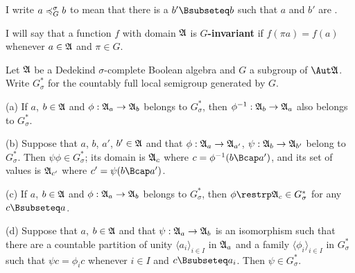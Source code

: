 I write $a\preccurlyeq^{\sigma}_G b$ to mean that there is a $b'\Bsubseteq b$ such
that $a$ and $b'$ are \Gse.

I will say that a function $f$ with domain
$\frak A$ is {\bf $G$-invariant} if $f(\pi a)=f(a)$ whenever
$a\in\frak A$ and $\pi\in G$.


 Let $\frak A$ be a Dedekind $\sigma$-complete
Boolean algebra and $G$ a subgroup of $\Aut\frak A$.   Write
$G^*_{\sigma}$ for the countably full local semigroup generated by $G$.

(a) If $a$, $b\in\frak A$ and $\phi:\frak A_a\to\frak A_b$ belongs to
$G^*_{\sigma}$, then $\phi^{-1}:\frak A_b\to\frak A_a$ also belongs to
$G^*_{\sigma}$.

(b) Suppose that $a$, $b$, $a'$, $b'\in\frak A$ and that
$\phi:\frak A_a\to\frak A_{a'}$, $\psi:\frak A_{b}\to\frak A_{b'}$
belong to $G^*_{\sigma}$.   Then $\psi\phi\in G^*_{\sigma}$;
its domain is $\frak A_c$ where $c=\phi^{-1}(b\Bcap a')$, and its
set of values is $\frak A_{c'}$ where $c'=\psi(b\Bcap a')$.

(c) If $a$, $b\in\frak A$ and $\phi:\frak A_a\to\frak A_b$ belongs to
$G^*_{\sigma}$, then $\phi\restrp\frak A_c\in G^*_{\sigma}$ for any
$c\Bsubseteq a$.

(d) Suppose that $a$, $b\in\frak A$ and that
$\psi:\frak A_a\to\frak A_b$ is an isomorphism such that there are a
countable partition of unity $\langle a_i\rangle_{i\in I}$ in
$\frak A_a$ and a family
$\langle\phi_i\rangle_{i\in I}$ in $G^*_{\sigma}$ such that
$\psi c=\phi_ic$ whenever $i\in I$ and $c\Bsubseteq a_i$.   Then
$\psi\in G^*_{\sigma}$.


